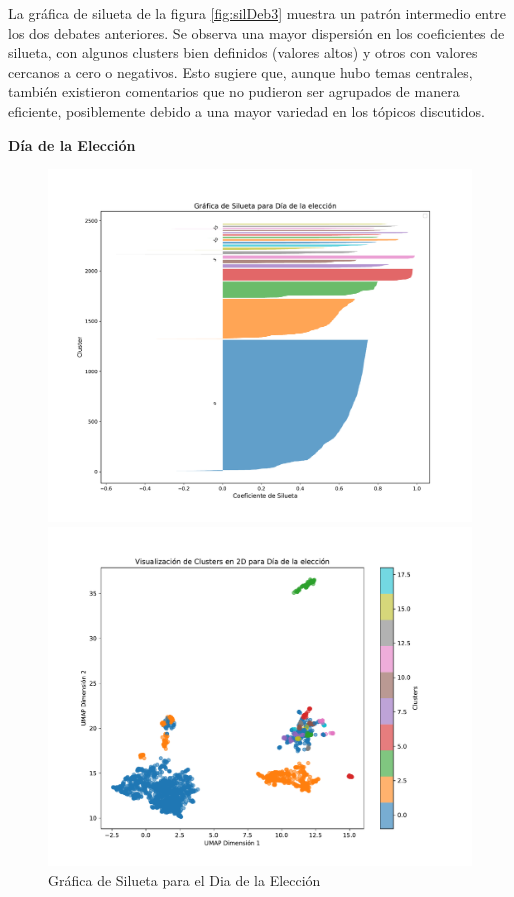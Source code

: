 \documentclass[10pt, a4paper]{article}
\begin{document}
	La gráfica de silueta de la figura \ref{fig:silDeb3} muestra un patrón intermedio entre los dos debates anteriores. Se observa una mayor dispersión en los coeficientes de silueta, con algunos clusters bien definidos (valores altos) y otros con valores cercanos a cero o negativos. Esto sugiere que, aunque hubo temas centrales, también existieron comentarios que no pudieron ser agrupados de manera eficiente, posiblemente debido a una mayor variedad en los tópicos discutidos.
	
	\vspace{4mm}
	\textbf{Día de la Elección}

	\begin{figure}[h!]
		\centering
		\begin{minipage}{0.49\textwidth} %
			\includegraphics[width=\linewidth]{silhouette_diaEleccion.pdf} 
			\caption{Gráfica de Silueta para el Dia de la Elección}
			\label{fig:silDiaEleccion}
		\end{minipage}
		\hfill %
		\begin{minipage}{0.49\textwidth}
			\includegraphics[width=\linewidth]{clusters_diaElección.pdf}

\end{minipage}
\end{figure}
\end{document}
